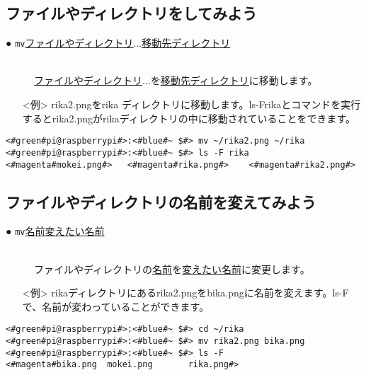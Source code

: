 \newpage
\subsection{ファイルやディレクトリをしてみよう}
\begin{description}
\item[● \texttt{mv}\textvisiblespace \underline{ファイルやディレクトリ}$\ldots$\textvisiblespace \underline{移動先ディレクトリ}]\mbox{}\\
\underline{ファイルやディレクトリ}$\ldots$を\underline{移動先ディレクトリ}に移動します。
\end{description}
\begin{itemize}
\item[<例>]rika2.pngをrika ディレクトリに移動します。ls\textvisiblespace -F\textvisiblespace rikaとコマンドを実行するとrika2.pngがrikaディレクトリの中に移動されていることをできます。
\end{itemize}
\begin{lstlisting}[caption=mvの例, label=mv]
<#green#pi@raspberrypi#>:<#blue#~ $#> mv ~/rika2.png ~/rika
<#green#pi@raspberrypi#>:<#blue#~ $#> ls -F rika
<#magenta#mokei.png#>	<#magenta#rika.png#>	<#magenta#rika2.png#>
\end{lstlisting}


\subsection{ファイルやディレクトリの名前を変えてみよう}
\begin{description}
\item[● \texttt{mv}\textvisiblespace \underline{名前}\textvisiblespace \underline{変えたい名前}]\mbox{}\\
ファイルやディレクトリの\underline{名前}を\underline{変えたい名前}に変更します。
\end{description}
\begin{itemize}
\item[<例>]rikaディレクトリにあるrika2.pngをbika.pngに名前を変えます。ls\textvisiblespace -Fで、名前が変わっていることができます。
\end{itemize}
\begin{lstlisting}[caption=ファイル名を変える, label=mvName]
<#green#pi@raspberrypi#>:<#blue#~ $#> cd ~/rika
<#green#pi@raspberrypi#>:<#blue#~ $#> mv rika2.png bika.png
<#green#pi@raspberrypi#>:<#blue#~ $#> ls -F
<#magenta#bika.png	mokei.png		rika.png#>
\end{lstlisting}

